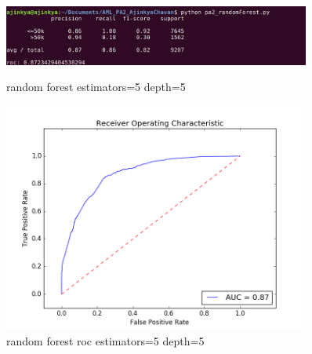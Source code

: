 \documentclass{article}
\begin{document}
\begin{figure}
    \centering
    \begin{minipage}{0.45\textwidth}
        \centering
        \includegraphics[width=0.9\textwidth]{random_5_5.png} %
        \caption{random forest estimators=5  depth=5}
    \end{minipage}\hfill
    \begin{minipage}{0.45\textwidth}
        \centering
        \includegraphics[width=0.9\textwidth]{roc_random_5_5.png} %
        \caption{random forest roc estimators=5 depth=5}
    \end{minipage}
\end{figure}
\end{document}
